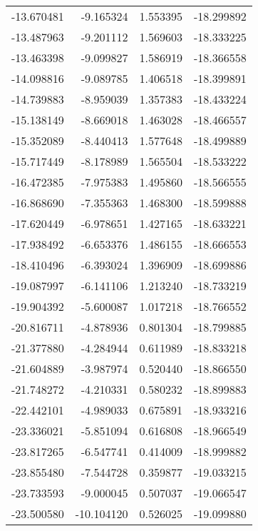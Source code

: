 \begin{tabular}{rrrr}
      -13.670481 &        -9.165324 &    1.553395 & -18.299892 \\
      -13.487963 &        -9.201112 &    1.569603 & -18.333225 \\
      -13.463398 &        -9.099827 &    1.586919 & -18.366558 \\
      -14.098816 &        -9.089785 &    1.406518 & -18.399891 \\
      -14.739883 &        -8.959039 &    1.357383 & -18.433224 \\
      -15.138149 &        -8.669018 &    1.463028 & -18.466557 \\
      -15.352089 &        -8.440413 &    1.577648 & -18.499889 \\
      -15.717449 &        -8.178989 &    1.565504 & -18.533222 \\
      -16.472385 &        -7.975383 &    1.495860 & -18.566555 \\
      -16.868690 &        -7.355363 &    1.468300 & -18.599888 \\
      -17.620449 &        -6.978651 &    1.427165 & -18.633221 \\
      -17.938492 &        -6.653376 &    1.486155 & -18.666553 \\
      -18.410496 &        -6.393024 &    1.396909 & -18.699886 \\
      -19.087997 &        -6.141106 &    1.213240 & -18.733219 \\
      -19.904392 &        -5.600087 &    1.017218 & -18.766552 \\
      -20.816711 &        -4.878936 &    0.801304 & -18.799885 \\
      -21.377880 &        -4.284944 &    0.611989 & -18.833218 \\
      -21.604889 &        -3.987974 &    0.520440 & -18.866550 \\
      -21.748272 &        -4.210331 &    0.580232 & -18.899883 \\
      -22.442101 &        -4.989033 &    0.675891 & -18.933216 \\
      -23.336021 &        -5.851094 &    0.616808 & -18.966549 \\
      -23.817265 &        -6.547741 &    0.414009 & -18.999882 \\
      -23.855480 &        -7.544728 &    0.359877 & -19.033215 \\
      -23.733593 &        -9.000045 &    0.507037 & -19.066547 \\
      -23.500580 &       -10.104120 &    0.526025 & -19.099880 \\

\end{tabular}
